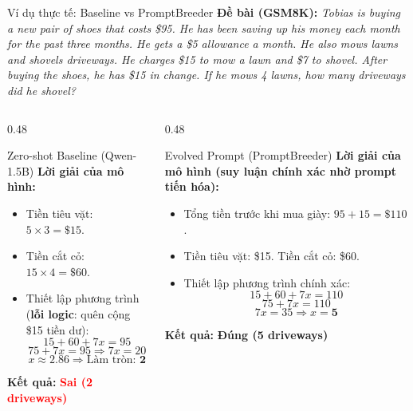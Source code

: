 \documentclass[english,main=vietnamese,xcolor=table]{beamer}
\begin{document}
\begin{frame}{Ví dụ thực tế: Baseline vs PromptBreeder}
\small
\textbf{Đề bài (GSM8K):} \textit{Tobias is buying a new pair of shoes that costs \$95. He has been saving up his money each month for the past three months. He gets a \$5 allowance a month. He also mows lawns and shovels driveways. He charges \$15 to mow a lawn and \$7 to shovel. After buying the shoes, he has \$15 in change. If he mows 4 lawns, how many driveways did he shovel?}

\vspace{0.1cm}
\begin{columns}[t]
\begin{column}{0.48\textwidth}
\begin{block}{Zero-shot Baseline (Qwen-1.5B)}
\tiny
\textbf{Lời giải của mô hình:}
\begin{itemize}
    \item Tiền tiêu vặt: $5 \times 3 = \$15$.
    \item Tiền cắt cỏ: $15 \times 4 = \$60$.
    \item Thiết lập phương trình (\textbf{lỗi logic}: quên cộng \$15 tiền dư):
    \[ 15 + 60 + 7x = 95 \]
    \[ 75 + 7x = 95 \Rightarrow 7x = 20 \]
    \[ x \approx 2.86 \Rightarrow \text{Làm tròn: } \mathbf{2} \]
\end{itemize}
\textbf{Kết quả:} \textcolor{red}{\textbf{Sai (2 driveways)}}
\end{block}
\end{column}

\begin{column}{0.48\textwidth}
\begin{block}{Evolved Prompt (PromptBreeder)}
\tiny
\textbf{Lời giải của mô hình (suy luận chính xác nhờ prompt tiến hóa):}
\begin{itemize}
    \item Tổng tiền trước khi mua giày: $95 + 15 = \$110$.
    \item Tiền tiêu vặt: \$15. Tiền cắt cỏ: \$60.
    \item Thiết lập phương trình chính xác:
    \[ 15 + 60 + 7x = 110 \]
    \[ 75 + 7x = 110 \]
    \[ 7x = 35 \Rightarrow x = \mathbf{5} \]
\end{itemize}
\textbf{Kết quả:} \textcolor{green!70!black}{\textbf{Đúng (5 driveways)}}
\end{block}
\end{column}
\end{columns}
\end{frame}
\end{document}

